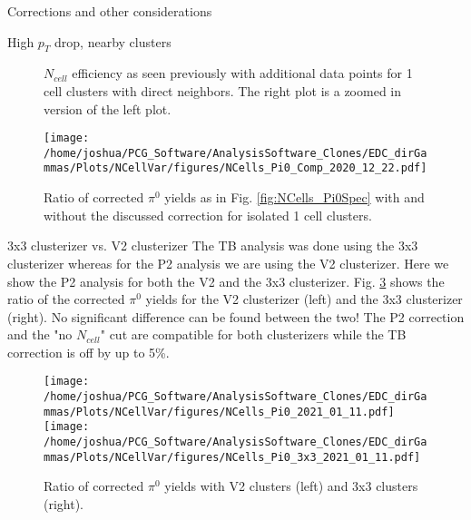 \documentclass[ALICE]{ALICE_analysis_notes}
\begin{document}
\begin{section}{Corrections and other considerations}
\begin{subsection}{High $p_{T}$ drop, nearby clusters}
\begin{figure}[ht!]
	\caption{ $N_{cell}$ efficiency as seen previously with additional data points for 1 cell clusters with direct neighbors. The right plot is a zoomed in version of the left plot.}
	\label{fig:ShowerOverlapsEffi}
\end{figure}

\begin{figure}[ht!]
	\centering
	\texttt{[image: /home/joshua/PCG\_Software/AnalysisSoftware\_Clones/EDC\_dirGammas/Plots/NCellVar/figures/NCells\_Pi0\_Comp\_2020\_12\_22.pdf]}
	
	\caption{ Ratio of corrected $\pi^{0}$ yields as in Fig. \ref{fig:NCells_Pi0Spec} with and without the discussed correction for isolated 1 cell clusters.  }
	\label{fig:ShowerOverlaps_Result}
\end{figure}
\end{subsection}
\newpage

\begin{subsection}{3x3 clusterizer vs. V2 clusterizer}
The TB analysis was done using the 3x3 clusterizer whereas for the P2 analysis we are using the V2 clusterizer. Here we show the P2 analysis for both the V2 and the 3x3 clusterizer. Fig. \ref{fig:3x3VsV2} shows the ratio of the corrected $\pi^{0}$ yields for the V2 clusterizer (left) and the 3x3 clusterizer (right). No significant difference can be found between the two! The P2 correction and the "no $N_{cell}$" cut are compatible for both clusterizers while the TB correction is off by up to 5\%.

\begin{figure}[ht!]
	\centering
	\texttt{[image: /home/joshua/PCG\_Software/AnalysisSoftware\_Clones/EDC\_dirGammas/Plots/NCellVar/figures/NCells\_Pi0\_2021\_01\_11.pdf]}	
	\texttt{[image: /home/joshua/PCG\_Software/AnalysisSoftware\_Clones/EDC\_dirGammas/Plots/NCellVar/figures/NCells\_Pi0\_3x3\_2021\_01\_11.pdf]}
	
	
	
	\caption{ Ratio of corrected $\pi^{0}$ yields with V2 clusters (left) and 3x3 clusters (right).  }
	\label{fig:3x3VsV2}
\end{figure}
\end{subsection}


\end{section}
\end{document}
